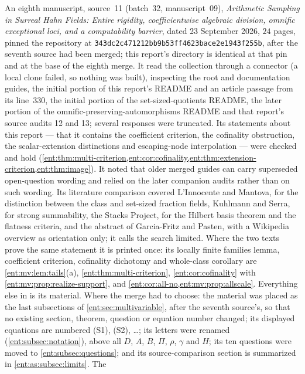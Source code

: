 \documentclass[11pt]{article}
\theoremstyle{plain}
\theoremstyle{plain}
\theoremstyle{plain}
\theoremstyle{definition}
\theoremstyle{definition}
\theoremstyle{definition}
\theoremstyle{definition}
\theoremstyle{remark}
\begin{document}
An eighth manuscript, source~11 (batch~32, manuscript~09),
\emph{Arithmetic Sampling in Surreal Hahn Fields: Entire rigidity,
coefficientwise algebraic division, omnific exceptional loci, and a
computability barrier}, dated 23 September 2026, $24$ pages, pinned the
repository at \texttt{343dc2c471212bb9b53f\allowbreak f4623bace2e1943f255b},
after the seventh source had been merged; this report's directory is identical
at that pin and at the base of the eighth merge. It read the collection
through a connector (a local clone failed, so nothing was built), inspecting
the root and documentation guides, the initial portion of this report's README
and an article passage from its line~330, the initial portion of the
set-sized-quotients README, the later portion of the
omnific-preserving-automorphisms README and that report's source audits 12 and
13; several responses were truncated. Its statements about this report ---
that it contains the coefficient criterion, the cofinality obstruction, the
scalar-extension distinctions and escaping-node interpolation --- were checked
and hold
(\cref{ent:thm:multi-criterion,ent:cor:cofinality,ent:thm:extension-criterion,ent:thm:image}).
It noted that older merged guides can carry superseded open-question wording
and relied on the later companion audits rather than on such wording. Its
literature comparison covered L'Innocente and Mantova, for the distinction
between the class and set-sized fraction fields, Kuhlmann and Serra, for strong
summability, the Stacks Project, for the Hilbert basis theorem and the flatness
criteria, and the abstract of Garcia-Fritz and Pasten, with a Wikipedia
overview as orientation only; it calls the search limited. Where the two texts
prove the same statement it is printed once: its locally finite families
lemma, coefficient criterion, cofinality dichotomy and whole-class corollary
are \cref{ent:mv:lem:tails}(a), \cref{ent:thm:multi-criterion},
\cref{ent:cor:cofinality} with \cref{ent:mv:prop:realize-support}, and
\cref{ent:cor:all-no,ent:mv:prop:allscale}. Everything else in
 is its material. Where
the merge had to choose: the material was placed as the last subsections of
\cref{ent:sec:multivariable}, after the seventh source's, so that no existing
section, theorem, question or equation number changed; its displayed equations
are numbered (S1), (S2), \ldots; its letters were renamed
(\cref{ent:subsec:notation}), above all $D$, $A$, $B$, $\Pi$, $\rho$, $\gamma$
and $H$; its ten questions were moved to \cref{ent:subsec:questions}; and its
source-comparison section is summarized in \cref{ent:as:subsec:limits}. The
\end{document}
